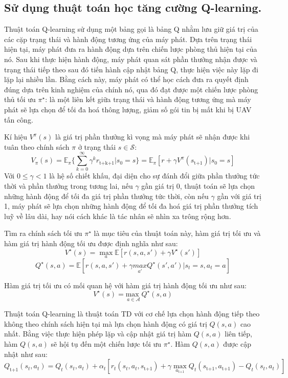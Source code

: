 \documentclass{uetgraduation}
\begin{document}
\subsection{Sử dụng thuật toán học tăng cường Q-learning.}
Thuật toán Q-learning sử dụng một bảng gọi là bảng Q nhằm lưu giữ giá trị của các cặp trạng thái và hành động tương ứng của máy phát. Dựa trên trạng thái hiện tại, máy phát đưa ra hành động dựa trên
chiến lược phòng thủ hiện tại của nó. Sau khi thực hiện hành động, máy phát quan sát phần thưởng nhận được và trạng thái tiếp theo sau đó tiến hành cập nhật bảng Q, thực hiện việc này lặp đi lặp lại nhiều lần. 
Bằng cách này, máy phát có thể học cách đưa ra quyết định đúng dựa trên kinh nghiệm của chính nó, qua đó đạt được một chiến lược phòng thủ tối ưu $\pi^\star$: là một liên kết giữa trạng thái và hành động tương
ứng mà máy phát sẽ lựa chọn để tối đa hoá thông lượng, giảm số gói tin bị mất khi bị UAV tấn công.

Kí hiệu $V^\pi (s)$ là giá trị phần thưởng kì vọng mà máy phát sẽ nhận được khi tuân theo chính sách $\pi$ ở trạng thái $s \in \mathcal{S}$:
\[
V_\pi (s) = \mathbb{E}_\pi \{\sum_{k=0}^{\infty} \gamma^k r_\text{t+k+1} | s_0 = s\} = \mathbb{E}_\pi [r + \gamma V^\pi (s_\text{t+1}) | s_0 = s]
\]
Với $0 \leq \gamma < 1$ là hệ số chiết khấu, đại diện cho sự đánh đổi giữa phần thưởng tức thời và phần thưởng trong tương lai, nếu $\gamma$ gần giá trị 0, thuật toán sẽ lựa chọn những hành động để
tối đa giá trị phần thưởng tức thời, còn nếu $\gamma$ gần với giá trị 1, máy phát sẽ lựa chọn những hành động để tối đa hoá giá trị phần thưởng tích luỹ về lâu dài, hay nói cách khác là tác nhân sẽ nhìn xa
trông rộng hơn.

Tìm ra chính sách tối ưu $\pi^\star$ là mục tiêu của thuật toán này, hàm giá trị tối ưu và hàm giá trị hành động tối ưu được định nghĩa như sau:
\[
V^\star (s) = \underset{a}{\max} \mathbb{E} [r(s, a, s') + \gamma V^\star (s')]
\]
\[
Q^\star (s, a) = \mathbb{E} [r(s, a, s') + \gamma \underset{a'}{ max } Q^\star (s', a') | s_t = s, a_t = a]
\]

Hàm giá trị tối ưu có mối quan hệ với hàm giá trị hành động tối ưu như sau:
\[
V^\star (s) = \underset{a \in \mathcal{A}}{\text{max }} Q^\star (s, a)
\]

Thuật toán Q-learning là thuật toán TD với cơ chế lựa chọn hành động tiếp theo không theo chính sách hiện tại mà lựa chọn hành động có giá trị
$Q(s, a)$ cao nhất. Bằng việc thực hiện phép lặp và cập nhật giá trị hàm $Q(s, a)$ liên tiếp, hàm $Q(s, a)$ sẽ hội tụ đến một chiến lược tối ưu $\pi^\star$.
Hàm $Q(s, a)$ được cập nhật như sau:
\[
Q_\text{t+1} (s_t, a_t) = Q_t (s_t, a_t) + \alpha_t [r_t(s_t, a_t, s_\text{t+1}) + \gamma \max_{a_\text{t+1}} Q_t (s_\text{t+1}, a_\text{t+1}) - Q_t (s_t, a_t) ]
\]
\end{document}
